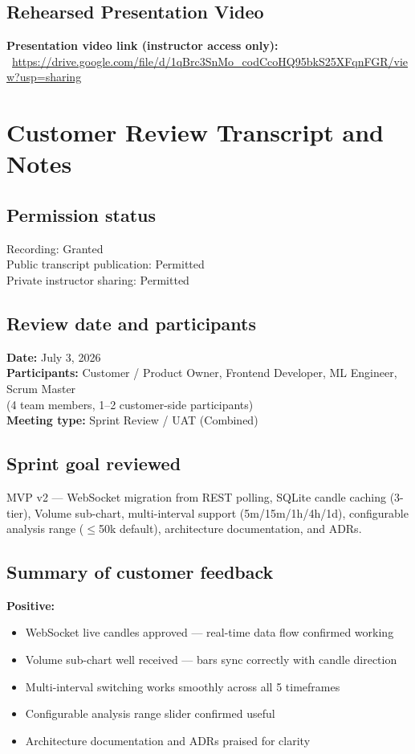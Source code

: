 \documentclass[11pt,a4paper]{article}
\begin{document}
\subsection{Rehearsed Presentation Video}
\textbf{Presentation video link (instructor access only):} \
\url{https://drive.google.com/file/d/1qBrc3SnMo_codCcoHQ95bkS25XFqnFGR/view?usp=sharing}

\section{Customer Review Transcript and Notes}

\subsection{Permission status}
Recording: Granted \\
Public transcript publication: Permitted \\
Private instructor sharing: Permitted

\subsection{Review date and participants}
\textbf{Date:} July 3, 2026 \\
\textbf{Participants:} Customer / Product Owner, Frontend Developer, ML Engineer, Scrum Master \\
(4 team members, 1--2 customer-side participants) \\
\textbf{Meeting type:} Sprint Review / UAT (Combined)

\subsection{Sprint goal reviewed}
MVP v2 --- WebSocket migration from REST polling, SQLite candle caching (3-tier), Volume sub-chart, multi-interval support (5m/15m/1h/4h/1d), configurable analysis range ($\leq$50k default), architecture documentation, and ADRs.

\subsection{Summary of customer feedback}
\textbf{Positive:}
\begin{itemize}
    \item WebSocket live candles approved --- real-time data flow confirmed working
    \item Volume sub-chart well received --- bars sync correctly with candle direction
    \item Multi-interval switching works smoothly across all 5 timeframes
    \item Configurable analysis range slider confirmed useful
    \item Architecture documentation and ADRs praised for clarity
\end{itemize}
\end{document}
